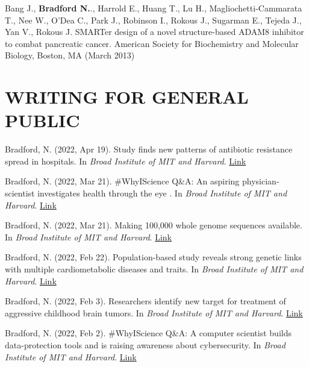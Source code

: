 \documentclass[margin, 10pt]{res} %
\begin{document}
\begin{resume}
Bang J., \textbf{Bradford N.}., Harrold E., Huang T., Lu H., Magliochetti-Cammarata T., Nee W., O'Dea C., Park J., Robinson I., Rokous J., Sugarman E., Tejeda J., Yan V., Rokous J. SMARTer design of a novel structure-based ADAM8 inhibitor to combat pancreatic cancer. American Society for Biochemistry and Molecular Biology, Boston, MA (March 2013)


\section{WRITING FOR GENERAL PUBLIC}
Bradford, N. (2022, Apr 19). Study finds new patterns of antibiotic resistance spread in hospitals. In {\sl Broad Institute of MIT and Harvard}. \href{https://www.broadinstitute.org/news/study-finds-new-patterns-antibiotic-resistance-spread-hospitals}{Link}

Bradford, N. (2022, Mar 21). \#WhyIScience Q\&A: An aspiring physician-scientist investigates health through the eye
. In {\sl Broad Institute of MIT and Harvard}. \href{https://www.broadinstitute.org/blog/whyiscience-qa-aspiring-physician-scientist-investigates-health-through-eye}{Link}

Bradford, N. (2022, Mar 21). Making 100,000 whole genome sequences available. In {\sl Broad Institute of MIT and Harvard}. \href{https://www.broadinstitute.org/news/making-100000-whole-genome-sequences-available}{Link}


Bradford, N. (2022, Feb 22). Population-based study reveals strong genetic links with multiple cardiometabolic diseases and traits. In {\sl Broad Institute of MIT and Harvard}. \href{https://www.broadinstitute.org/news/population-based-study-reveals-strong-genetic-links-multiple-cardiometabolic-diseases-and-0}{Link}

Bradford, N. (2022, Feb 3). Researchers identify new target for treatment of aggressive childhood brain tumors. In {\sl Broad Institute of MIT and Harvard}. \href{https://www.broadinstitute.org/news/researchers-identify-new-target-treatment-aggressive-childhood-brain-tumors}{Link}

Bradford, N. (2022, Feb 2). \#WhyIScience Q\&A: A computer scientist builds data-protection tools and is raising awareness about cybersecurity. In {\sl Broad Institute of MIT and Harvard}. \href{https://www.broadinstitute.org/blog/whyiscience-qa-computer-scientist-builds-data-protection-tools-and-raising-awareness-about}{Link}


\end{resume}
\end{document}

